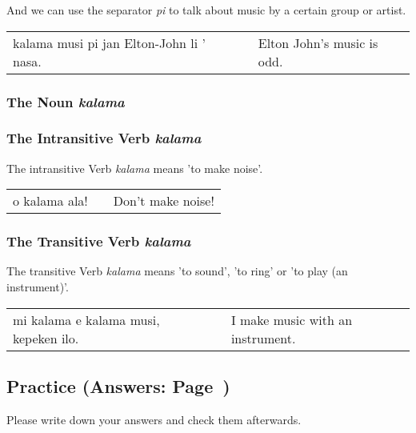 And we can use the separator \textit{pi} to talk about music by a certain group or artist. 

\begin{supertabular}{p{5,5cm}|ll}
kalama musi pi jan Elton-John li ' nasa. && Elton John's music is odd. \\
\end{supertabular}  


\subsubsection*{The Noun \textit{kalama}}
%
%
\subsubsection*{The Intransitive Verb \textit{kalama}}
%
%

The intransitive Verb \textit{kalama} means 'to make noise'.

\begin{supertabular}{p{5,5cm}|ll}
o kalama ala! && Don't make noise! \\
\end{supertabular}  

%
\subsubsection*{The Transitive Verb \textit{kalama}}
%
%

The transitive Verb \textit{kalama} means 'to sound', 'to ring' or 'to play (an instrument)'.

\begin{supertabular}{p{5,5cm}|ll}
mi kalama e kalama musi, kepeken ilo. && I make music with an instrument. \\
\end{supertabular} 

%
%
%
%
\newpage
%
\subsection*{Practice (Answers: Page~\pageref{'pi'})}
%
Please write down your answers and check them afterwards. 

